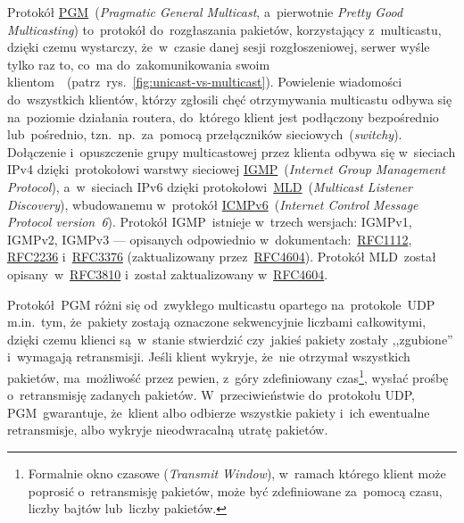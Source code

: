 \documentclass[thesis]{subfiles}
\begin{document}
Protokół \href{https://tools.ietf.org/html/rfc3208}{PGM}~(\emph{Pragmatic General Multicast}, a~pierwotnie \emph{Pretty Good Multicasting}) to~protokół do~rozgłaszania pakietów, korzystający z~multicastu, dzięki czemu wystarczy, że~w~czasie danej sesji rozgłoszeniowej, serwer wyśle tylko raz to, co~ma do~zakomunikowania swoim klientom~\cite{pgm-rfc}~(patrz~rys.~\ref{fig:unicast-vs-multicast}). Powielenie wiadomości do~wszystkich klientów, którzy zgłosili chęć otrzymywania multicastu odbywa się na~poziomie działania routera, do~którego klient jest podłączony bezpośrednio lub~pośrednio, tzn.~np.~za~pomocą przełączników sieciowych~(\emph{switchy}). Dołączenie i~opuszczenie grupy multicastowej przez klienta odbywa się w~sieciach IPv4 dzięki~protokołowi warstwy sieciowej \href{https://en.wikipedia.org/wiki/Internet_Group_Management_Protocol}{IGMP}~(\emph{Internet Group Management Protocol}), a~w~sieciach IPv6 dzięki protokołowi~\href{https://en.wikipedia.org/wiki/Multicast_Listener_Discovery}{MLD}~(\emph{Multicast Listener Discovery}), wbudowanemu w~protokół \href{https://en.wikipedia.org/wiki/Internet_Control_Message_Protocol_version_6}{ICMPv6}~(\emph{Internet Control Message Protocol version~6}). Protokół IGMP~istnieje w~trzech wersjach: IGMPv1, IGMPv2, IGMPv3 --- opisanych odpowiednio w~dokumentach:~\href{https://tools.ietf.org/html/rfc1112}{RFC1112}, \href{https://tools.ietf.org/html/rfc2236}{RFC2236} i~\href{https://tools.ietf.org/html/rfc3376}{RFC3376} (zaktualizowany przez~\href{https://tools.ietf.org/html/rfc4604}{RFC4604}). Protokół MLD~został opisany~w~\href{https://tools.ietf.org/html/rfc3810}{RFC3810} i~został zaktualizowany w~\href{https://tools.ietf.org/html/rfc4604}{RFC4604}.

Protokół~PGM różni się od~zwykłego multicastu opartego na~protokole~UDP m.in.~tym, że~pakiety zostają oznaczone sekwencyjnie liczbami całkowitymi, dzięki czemu klienci są~w~stanie stwierdzić czy~jakieś pakiety zostały ,,zgubione'' i~wymagają retransmisji. Jeśli klient wykryje, że~nie otrzymał wszystkich pakietów, ma~możliwość przez pewien, z~góry zdefiniowany czas\footnote{Formalnie okno czasowe (\emph{Transmit Window}), w~ramach którego klient może poprosić o~retransmisję pakietów, może być zdefiniowane za~pomocą czasu, liczby bajtów lub~liczby pakietów.}, wysłać prośbę o~retransmisję zadanych pakietów. W~przeciwieństwie do~protokołu UDP, PGM~gwarantuje, że~klient albo odbierze wszystkie pakiety i~ich ewentualne retransmisje, albo wykryje nieodwracalną utratę pakietów.
\end{document}
